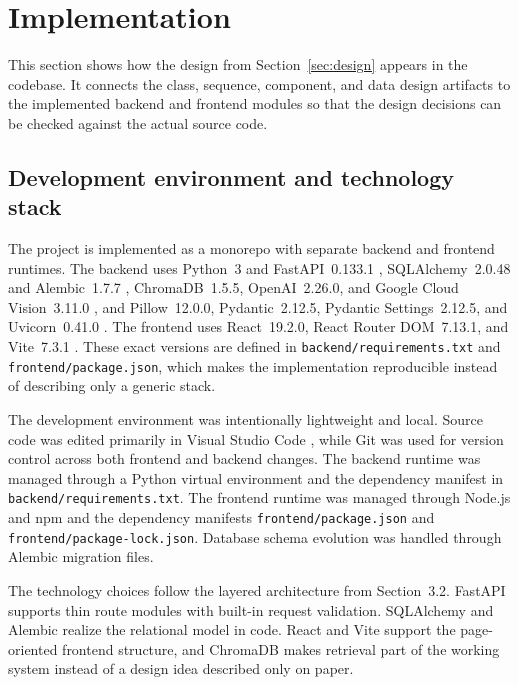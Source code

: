 \section{Implementation}
\label{ch:implementation}

This section shows how the design from Section~\ref{sec:design} appears in the
codebase. It connects the class, sequence, component, and data design
artifacts to the implemented backend and frontend modules so that the
design decisions can be checked against the actual source code.

\subsection{Development environment and technology stack}

The project is implemented as a monorepo with separate backend and
frontend runtimes. The backend uses Python~3 and FastAPI~0.133.1
\cite{python2026setup,fastapi2026docs}, SQLAlchemy~2.0.48 and
Alembic~1.7.7 \cite{sqlalchemy2026docs,alembic2026docs},
ChromaDB~1.5.5, OpenAI~2.26.0, and Google Cloud Vision~3.11.0
\cite{chromadb2026docs,openai2026platform,google2026vision}, and
Pillow~12.0.0, Pydantic~2.12.5, Pydantic Settings~2.12.5, and
Uvicorn~0.41.0
\cite{pillow2026docs,pydantic2026docs,pydanticsettings2026docs,uvicorn2026docs}.
The frontend uses React~19.2.0, React Router DOM~7.13.1, and
Vite~7.3.1 \cite{react2026docs,reactrouter2026docs,vite2026docs}.
These exact versions are defined in \texttt{backend/requirements.txt}
and \texttt{frontend/package.json}, which makes the implementation
reproducible instead of describing only a generic stack.

The development environment was intentionally lightweight and local.
Source code was edited primarily in Visual Studio Code
\cite{vscode2026docs}, while Git \cite{git2026docs} was used for
version control across both frontend and backend changes. The backend
runtime was managed through a Python virtual environment
and the dependency manifest in
\texttt{backend/requirements.txt}. The frontend runtime was managed
through Node.js and npm \cite{node2026docs,npm2026docs} and the
dependency manifests \texttt{frontend/package.json} and
\texttt{frontend/package-lock.json}. Database schema evolution was
handled through Alembic migration files.

The technology choices follow the layered architecture from
Section~3.2. FastAPI supports thin route modules with built-in request
validation. SQLAlchemy and Alembic realize the relational model in
code. React and Vite support the page-oriented frontend structure, and
ChromaDB makes retrieval part of the working system instead of a design
idea described only on paper.


